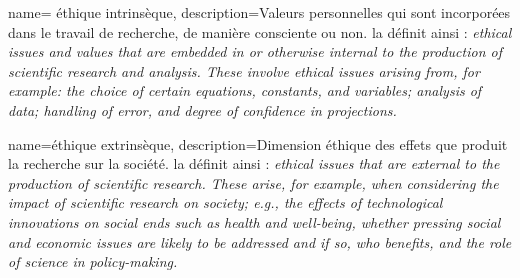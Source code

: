 {
    name= éthique intrinsèque, 
    description={Valeurs personnelles qui sont incorporées dans le travail de recherche, de manière consciente ou non. \cite{tuana_leading_2010} la définit ainsi : \textit{ethical issues and values that are embedded in or otherwise internal to the production of scientific research and analysis. These involve ethical issues arising from, for example: the choice of certain equations, constants, and variables; analysis of data; handling of error, and degree of confidence in projections.}}
}

{
    name=éthique extrinsèque, 
    description={Dimension éthique des effets que produit la recherche sur la société. \cite{tuana_leading_2010} la définit ainsi : \textit{ethical issues that are external to the production of scientific research. These arise, for example, when considering the impact of scientific research on society; e.g., the effects of technological innovations on social ends such as health and well-being, whether pressing social and economic issues are likely to be addressed and if so, who benefits, and the role of science in policy-making.}}
}







